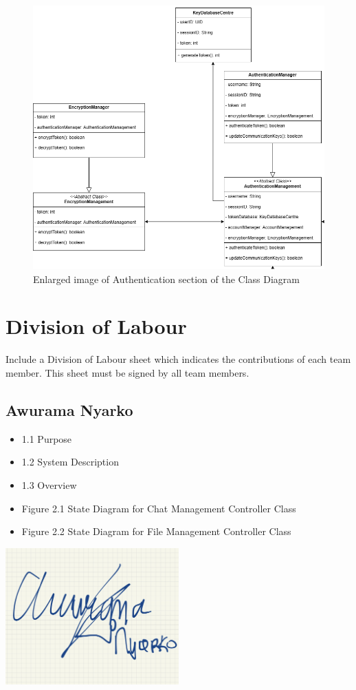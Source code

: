 \documentclass[]{article}
\begin{document}
\begin{figure}[H]
	\centering
	\includegraphics[width=1\textwidth]{authentication-class-diagram.png}
	\caption{Enlarged image of Authentication section of the Class Diagram}
	\label{fig:class-diagram}
\end{figure}



\appendix
\section{Division of Labour}
\label{sec:division_of_labour}
Include a Division of Labour sheet which indicates the contributions of each team member. This sheet must be signed by all team members.
\subsection{Awurama Nyarko}
\label{subsec:awurama_nyarko}
\begin{itemize}
	\item 1.1 Purpose
	\item 1.2 System Description
	\item 1.3 Overview
	\item Figure 2.1 State Diagram for Chat Management Controller Class
	\item Figure 2.2 State Diagram for File Management Controller Class
\end{itemize}
\includegraphics[width=0.5\textwidth]{awurama.jpg}
\end{document}
